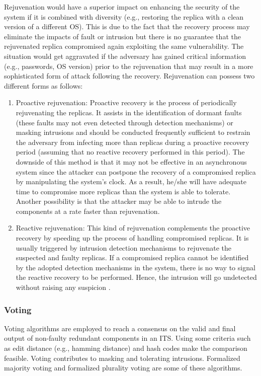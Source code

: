 \documentclass[preprint,number,12pt]{elsarticle}
\begin{document}
Rejuvenation would have a superior impact on enhancing the security of the system if it is combined with diversity (e.g., restoring the replica with a clean version of a different OS). This is due to the fact that the recovery process may eliminate the impacts of fault or intrusion but there is no guarantee that the rejuvenated replica compromised again exploiting the same vulnerability. The situation would get aggravated if the adversary has gained critical information (e.g., passwords, OS version) prior to the rejuvenation that may result in a more sophisticated form of attack following the recovery.
Rejuvenation can possess two different forms as follows:
\begin{enumerate}
\item Proactive rejuvenation: Proactive recovery is the process of periodically rejuvenating the replicas. It assists in the identification of dormant faults (these faults may not even detected through detection mechanisms) or masking intrusions and should be conducted frequently sufficient to restrain the adversary from infecting more than  replicas during a proactive recovery period (assuming that no reactive recovery performed in this period). The downside of this method is that it may not be effective in an asynchronous system since the attacker can postpone the recovery of a compromised replica by manipulating the system's clock. As a result, he/she will have adequate time to compromise more replicas than the system is able to tolerate\citep{Sousa2010}. Another possibility is that the attacker may be able to intrude the components at a rate faster than rejuvenation\citep{Sousa2006}.
\item Reactive rejuvenation: This kind of rejuvenation complements the 
proactive recovery by speeding up the process of handling compromised
 replicas. It is usually triggered by intrusion detection mechanisms to 
rejuvenate  the suspected and faulty replicas. If a compromised replica 
cannot be identified by the adopted detection mechanisms in the system, 
there is no way to signal the reactive recovery to be performed. Hence, 
the intrusion will go undetected without raising any suspicion \citep{springerlink:10.1007/978-3-642-23971-7_36}.
\end{enumerate}
\subsubsection{Voting}
Voting algorithms are employed to reach a consensus on the valid and final output of non-faulty redundant components in an ITS. Using some criteria such as edit distance (e.g., hamming distance) and hash codes make the comparison feasible. Voting contributes to masking and tolerating intrusions. Formalized majority voting and formalized plurality voting are some of these algorithms\citep{Wang2003b}.
\end{document}
